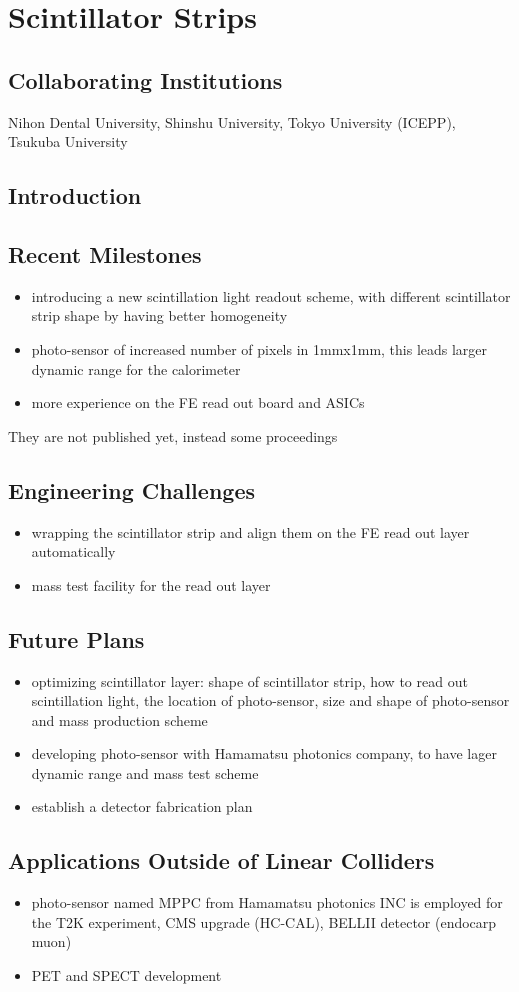 \section{Scintillator Strips}
\subsection{Collaborating Institutions}
Nihon Dental University, Shinshu University, Tokyo University (ICEPP), Tsukuba University
\subsection{Introduction}
\subsection{Recent Milestones}
\begin{itemize}
	\item introducing a new scintillation light readout scheme, with different scintillator strip shape  by having better homogeneity 
	\item photo-sensor of increased number of pixels in 1mmx1mm, this leads larger dynamic range for the calorimeter
	\item more experience on the FE read out board and ASICs
\end{itemize}
They are not published yet, instead some proceedings 

\subsection{Engineering Challenges}
\begin{itemize}
	\item wrapping the scintillator strip and align them on the FE read out layer automatically 
	\item mass test facility for the read out layer
\end{itemize}

\subsection{Future Plans}
\begin{itemize}
	\item optimizing scintillator layer: shape of scintillator strip, how to read out scintillation light, the location of  photo-sensor, size and shape of photo-sensor and mass production scheme
	\item developing photo-sensor with Hamamatsu photonics company, to have lager dynamic range and mass test scheme
	\item establish a detector fabrication plan
\end{itemize}

\subsection{Applications Outside of Linear Colliders}
\begin{itemize}
	\item photo-sensor named MPPC from Hamamatsu photonics INC is employed for the T2K experiment, CMS upgrade (HC-CAL), BELLII detector (endocarp muon)
	\item PET and SPECT development 
\end{itemize}
